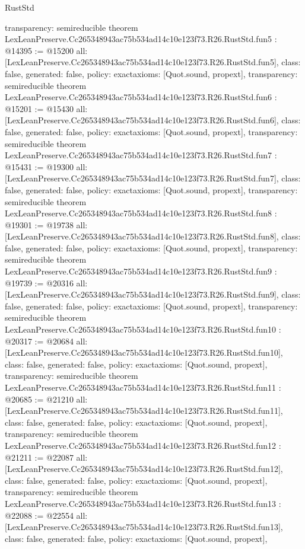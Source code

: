 \begin{lexlean}{RustStd}
\begin{coremodule}
{  transparency: semireducible
}
theorem LexLeanPreserve.Cc265348943ac75b534ad14c10e123f73.R26.RustStd.fun5 : @14395 := @15200 {
  all: [LexLeanPreserve.Cc265348943ac75b534ad14c10e123f73.R26.RustStd.fun5],
  class: false,
  generated: false,
  policy: exact{axioms: [Quot.sound, propext]},
  transparency: semireducible
}
theorem LexLeanPreserve.Cc265348943ac75b534ad14c10e123f73.R26.RustStd.fun6 : @15201 := @15430 {
  all: [LexLeanPreserve.Cc265348943ac75b534ad14c10e123f73.R26.RustStd.fun6],
  class: false,
  generated: false,
  policy: exact{axioms: [Quot.sound, propext]},
  transparency: semireducible
}
theorem LexLeanPreserve.Cc265348943ac75b534ad14c10e123f73.R26.RustStd.fun7 : @15431 := @19300 {
  all: [LexLeanPreserve.Cc265348943ac75b534ad14c10e123f73.R26.RustStd.fun7],
  class: false,
  generated: false,
  policy: exact{axioms: [Quot.sound, propext]},
  transparency: semireducible
}
theorem LexLeanPreserve.Cc265348943ac75b534ad14c10e123f73.R26.RustStd.fun8 : @19301 := @19738 {
  all: [LexLeanPreserve.Cc265348943ac75b534ad14c10e123f73.R26.RustStd.fun8],
  class: false,
  generated: false,
  policy: exact{axioms: [Quot.sound, propext]},
  transparency: semireducible
}
theorem LexLeanPreserve.Cc265348943ac75b534ad14c10e123f73.R26.RustStd.fun9 : @19739 := @20316 {
  all: [LexLeanPreserve.Cc265348943ac75b534ad14c10e123f73.R26.RustStd.fun9],
  class: false,
  generated: false,
  policy: exact{axioms: [Quot.sound, propext]},
  transparency: semireducible
}
theorem LexLeanPreserve.Cc265348943ac75b534ad14c10e123f73.R26.RustStd.fun10 : @20317 := @20684 {
  all: [LexLeanPreserve.Cc265348943ac75b534ad14c10e123f73.R26.RustStd.fun10],
  class: false,
  generated: false,
  policy: exact{axioms: [Quot.sound, propext]},
  transparency: semireducible
}
theorem LexLeanPreserve.Cc265348943ac75b534ad14c10e123f73.R26.RustStd.fun11 : @20685 := @21210 {
  all: [LexLeanPreserve.Cc265348943ac75b534ad14c10e123f73.R26.RustStd.fun11],
  class: false,
  generated: false,
  policy: exact{axioms: [Quot.sound, propext]},
  transparency: semireducible
}
theorem LexLeanPreserve.Cc265348943ac75b534ad14c10e123f73.R26.RustStd.fun12 : @21211 := @22087 {
  all: [LexLeanPreserve.Cc265348943ac75b534ad14c10e123f73.R26.RustStd.fun12],
  class: false,
  generated: false,
  policy: exact{axioms: [Quot.sound, propext]},
  transparency: semireducible
}
theorem LexLeanPreserve.Cc265348943ac75b534ad14c10e123f73.R26.RustStd.fun13 : @22088 := @22554 {
  all: [LexLeanPreserve.Cc265348943ac75b534ad14c10e123f73.R26.RustStd.fun13],
  class: false,
  generated: false,
  policy: exact{axioms: [Quot.sound, propext]},
}
\end{coremodule}
\end{lexlean}

